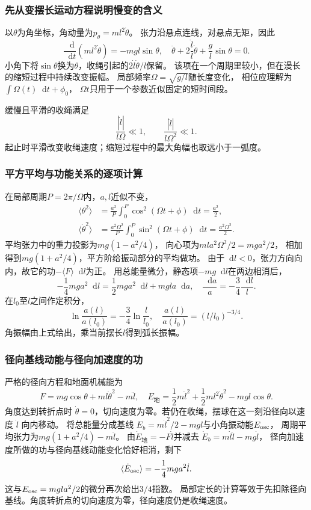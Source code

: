 \documentclass[UTF8,fontset=fandol,a4paper,11pt]{ctexart}
\newcommand{\dd}{\mathop{}\!\mathrm{d}}
\begin{document}
\subsubsection*{先从变摆长运动方程说明慢变的含义}
以$\theta$为角坐标，角动量为$p_\theta=ml^2\dot\theta$。
张力沿悬点连线，对悬点无矩，因此
\[
\frac{\dd}{\dd t}(ml^2\dot\theta)=-mgl\sin\theta,
\quad\ddot\theta+2\frac{\dot l}{l}\dot\theta+\frac gl\sin\theta=0.
\]
小角下将$\sin\theta$换为$\theta$，收绳引起的$2\dot l\dot\theta/l$保留。
该项在一个周期里较小，但在漫长的缩短过程中持续改变振幅。
局部频率$\Omega=\sqrt{g/l}$随长度变化，
相位应理解为$\int\Omega(t)\dd t+\phi_0$，
$\Omega t$只用于一个参数近似固定的短时间段。

缓慢且平滑的收绳满足
\[
\frac{|\dot l|}{l\Omega}\ll1,\qquad
\frac{|\ddot l|}{l\Omega^2}\ll1.
\]
起止时平滑改变收绳速度；缩短过程中的最大角幅也取远小于一弧度。

\subsubsection*{平方平均与功能关系的逐项计算}
在局部周期$P=2\pi/\Omega$内，$a,l$近似不变，
\[
\begin{aligned}
\langle\theta^2\rangle
&=\frac{a^2}{P}\int_0^P\cos^2(\Omega t+\phi)\dd t
=\frac{a^2}{2},\\
\langle\dot\theta^2\rangle
&=\frac{a^2\Omega^2}{P}\int_0^P\sin^2(\Omega t+\phi)\dd t
=\frac{a^2\Omega^2}{2}.
\end{aligned}
\]
平均张力中的重力投影为$mg(1-a^2/4)$，
向心项为$mla^2\Omega^2/2=mga^2/2$，
相加得到$mg(1+a^2/4)$，平方阶给振动部分的平均做功。
由于$\dd l<0$，张力方向向内，故它的功$-\langle F\rangle\dd l$为正。
用总能量微分，静态项$-mg\dd l$在两边相消后，
\[
-\frac14mga^2\dd l
=\frac12mga^2\dd l+mgla\dd a,
\quad\frac{\dd a}{a}=-\frac34\frac{\dd l}{l}.
\]
在$l_0$至$l$之间作定积分，
\[
\ln\frac{a(l)}{a(l_0)}=-\frac34\ln\frac l{l_0},
\quad\frac{a(l)}{a(l_0)}=(l/l_0)^{-3/4}.
\]
角振幅由上式给出，乘当前摆长$l$得到弧长振幅。

\subsubsection*{径向基线动能与径向加速度的功}
严格的径向方程和地面机械能为
\[
F=mg\cos\theta+ml\dot\theta^2-m\ddot l,
\quad E_{\text{地}}=\frac12m\dot l^2+\frac12ml^2\dot\theta^2-mgl\cos\theta.
\]
角度达到转折点时 $\dot\theta=0$，切向速度为零。若仍在收绳，摆球在这一刻沿径向以速度 $\dot l$ 向内移动。
将总能量分成基线
$E_b=m\dot l^2/2-mgl$与小角振动能$E_{\rm osc}$，
周期平均张力为$mg(1+a^2/4)-m\ddot l$。
由$\dot E_{\text{地}}=-F\dot l$并减去
$\dot E_b=m\dot l\ddot l-mg\dot l$，
径向加速度所做的功与径向基线动能变化恰好相消，剩下
\[
\langle\dot E_{\rm osc}\rangle=-\frac14mga^2\dot l.
\]
这与$E_{\rm osc}=mgla^2/2$的微分再次给出$3/4$指数。
局部定长的计算等效于先扣除径向基线。角度转折点的切向速度为零，径向速度仍是收绳速度。
\end{document}
